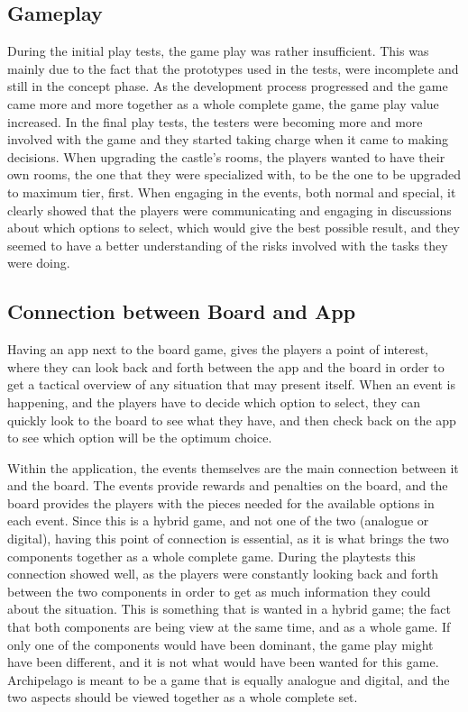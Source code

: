 \subsection{Gameplay}

During the initial play tests, the game play was rather insufficient.  This was mainly due to the fact that the prototypes used in the tests, were incomplete and still in the concept phase. As the development process progressed and the game came more and more together as a whole complete game, the game play value increased. In the final play tests, the testers were becoming more and more involved with the game and they started taking charge when it came to making decisions. When upgrading the castle's rooms, the players wanted to have their own rooms, the one that they were specialized with, to be the one to be upgraded to maximum tier, first. When engaging in the events, both normal and special, it clearly showed that the players were communicating and engaging in discussions about which options to select, which would give the best possible result, and they seemed to have a better understanding of the risks involved with the tasks they were doing. 

\subsection{Connection between Board and App}
Having an app next to the board game, gives the players a point of interest, where they can look back and forth between the app and the board in order to get a tactical overview of any situation that may present itself. When an event is happening, and the players have to decide which option to select, they can quickly look to the board to see what they have, and then check back on the app to see which option will be the optimum choice.

Within the application, the events themselves are the main connection between it and the board. The events provide rewards and penalties on the board, and the board provides the players with the pieces needed for the available options in each event. 
Since this is a hybrid game, and not one of the two (analogue or digital), having this point of connection is essential, as it is what brings the two components together as a whole complete game. During the playtests this connection showed well, as the players were constantly looking back and forth between the two components in order to get as much information they could about the situation. This is something that is wanted in a hybrid game; the fact that both components are being view at the same time, and as a whole game. If only one of the components would have been dominant, the game play might have been different, and it is not what would have been wanted for this game. Archipelago is meant to be a game that is equally analogue and digital, and the two aspects should be viewed together as a whole complete set.


